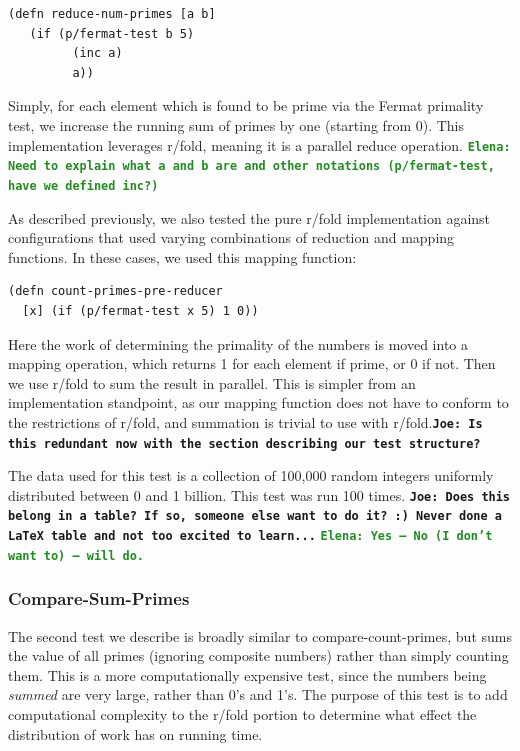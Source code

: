 \documentclass[12pt]{article}
\newcommand{\comment}[1]{{\bf \tt  {#1}}}
\newcommand{\emcomment}[1]{\textcolor{ForestGreen}{\comment{Elena: {#1}}}}
\newcommand{\joecomment}[1]{\textcolor{JoesGold}{\comment{Joe: {#1}}}}
\begin{document}
\begin{verbatim}
(defn reduce-num-primes [a b] 
   (if (p/fermat-test b 5)
         (inc a)
         a))
\end{verbatim}

Simply, for each element which is found to be prime via the Fermat primality test, we increase the running sum of primes by one (starting from 0). This implementation leverages r/fold, meaning it is a parallel reduce operation. 
\emcomment{Need to explain what a and b are and other notations (p/fermat-test, have we defined inc?) }

As described previously, we also tested the pure r/fold implementation against configurations that used varying combinations of reduction and mapping functions. In these cases, we used this mapping function:

\begin{verbatim}
(defn count-primes-pre-reducer
  [x] (if (p/fermat-test x 5) 1 0))
\end{verbatim}

Here the work of determining the primality of the numbers is moved into a mapping operation, which returns 1 for each element if prime, or 0 if not. Then we use r/fold to sum the result in parallel. This is simpler from an implementation standpoint, as our mapping function does not have to conform to the restrictions of r/fold, and summation is trivial to use with r/fold.\joecomment{Is this redundant now with the section describing our test structure?}

The data used for this test is a collection of 100,000 random integers uniformly distributed between 0 and 1 billion. This test was run 100 times. \joecomment{Does this belong in a table? If so, someone else want to do it? :) Never done a LaTeX table and not too excited to learn...}
\emcomment{Yes -- No (I don't want to) -- will do.}

  
\subsubsection{Compare-Sum-Primes}\label{sec:sum-primes}
The second test we describe is broadly similar to compare-count-primes, but sums the value of all primes (ignoring composite numbers) rather than simply counting them. This is a more computationally expensive test, since the numbers being \emph{summed} are very large, rather than 0's and 1's. The purpose of this test is to add computational complexity to the r/fold portion to determine what effect the distribution of work has on running time.
\end{document}
